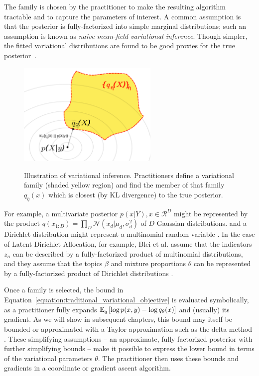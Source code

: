 The family is chosen by the practitioner to make the resulting
algorithm tractable and to capture the parameters of interest. A
common assumption is that the posterior is fully-factorized into
simple marginal distributions; such an assumption is known as
\emph{naive mean-field variational inference}. Though simpler, the
fitted variational distributions are found to be good proxies for the
true posterior~\cite{jordan:1999,gerrish:2011}.

\begin{figure}
  \center
  \includegraphics[width=0.6\textwidth]{chapter_introductory_material/figs/variational_family.pdf}
  \label{fig:variational_inference}
  \caption{Illustration of variational inference.  Practitioners
    define a variational family (shaded yellow region) and find the
    member of that family $q_{\hat \eta}(x)$ which is closest (by KL
    divergence) to the true posterior.}
\end{figure}
For example, a multivariate posterior $p(x | Y), x \in \mathcal{R}^D$
might be represented by the product $q(x_{1:D}) = \prod_D \mathcal{N}(x_d | \mu_d,
\sigma_d^2)$ of $D$ Gaussian distributions. and a Dirichlet
distribution might represent a multinomial random variable
\cite{bishop:2006}.  In the case of Latent Dirichlet Allocation, for
example, Blei et al. assume that the indicators $z_n$ can be
described by a fully-factorized product of multinomial distributions,
and they assume that the topics $\beta$ and mixture proportions
$\theta$ can be represented by a fully-factorized product of Dirichlet
distributions \cite{blei:2003}.

Once a family is selected, the bound in
Equation~\ref{equation:traditional_variational_objective} is evaluated
symbolically, as a practitioner fully expands $\mathbb{E}_q\left[ \log p(x, y)
  - \log q_\theta(x)\right]$ and (usually) its gradient. As we will show in
subsequent chapters, this bound may itself be bounded or approximated
with a Taylor approximation such as the delta method
\cite{bickel:2007,braun:2007}. These simplifying assumptions -- an
approximate, fully factorized posterior with further simplifying
bounds -- make it possible to express the lower bound in terms of the
variational parameters $\theta$.  The practitioner then uses these
bounds and gradients in a coordinate or
gradient ascent algorithm.


